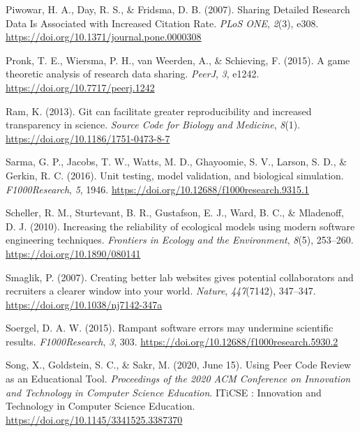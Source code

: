 \begin{CSLReferences}{1}{0}
\leavevmode{}%
Piwowar, H. A., Day, R. S., \& Fridsma, D. B. (2007). Sharing Detailed Research Data Is Associated with Increased Citation Rate. \emph{PLoS ONE}, \emph{2}(3), e308. \url{https://doi.org/10.1371/journal.pone.0000308}

\leavevmode{}%
Pronk, T. E., Wiersma, P. H., van Weerden, A., \& Schieving, F. (2015). A game theoretic analysis of research data sharing. \emph{PeerJ}, \emph{3}, e1242. \url{https://doi.org/10.7717/peerj.1242}

\leavevmode{}%
Ram, K. (2013). Git can facilitate greater reproducibility and increased transparency in science. \emph{Source Code for Biology and Medicine}, \emph{8}(1). \url{https://doi.org/10.1186/1751-0473-8-7}

\leavevmode{}%
Sarma, G. P., Jacobs, T. W., Watts, M. D., Ghayoomie, S. V., Larson, S. D., \& Gerkin, R. C. (2016). Unit testing, model validation, and biological simulation. \emph{F1000Research}, \emph{5}, 1946. \url{https://doi.org/10.12688/f1000research.9315.1}

\leavevmode{}%
Scheller, R. M., Sturtevant, B. R., Gustafson, E. J., Ward, B. C., \& Mladenoff, D. J. (2010). Increasing the reliability of ecological models using modern software engineering techniques. \emph{Frontiers in Ecology and the Environment}, \emph{8}(5), 253--260. \url{https://doi.org/10.1890/080141}

\leavevmode{}%
Smaglik, P. (2007). Creating better lab websites gives potential collaborators and recruiters a clearer window into your world. \emph{Nature}, \emph{447}(7142), 347--347. \url{https://doi.org/10.1038/nj7142-347a}

\leavevmode{}%
Soergel, D. A. W. (2015). Rampant software errors may undermine scientific results. \emph{F1000Research}, \emph{3}, 303. \url{https://doi.org/10.12688/f1000research.5930.2}

\leavevmode{}%
Song, X., Goldstein, S. C., \& Sakr, M. (2020, June 15). Using Peer Code Review as an Educational Tool. \emph{Proceedings of the 2020 ACM Conference on Innovation and Technology in Computer Science Education}. ITiCSE : Innovation and Technology in Computer Science Education. \url{https://doi.org/10.1145/3341525.3387370}


\end{CSLReferences}
